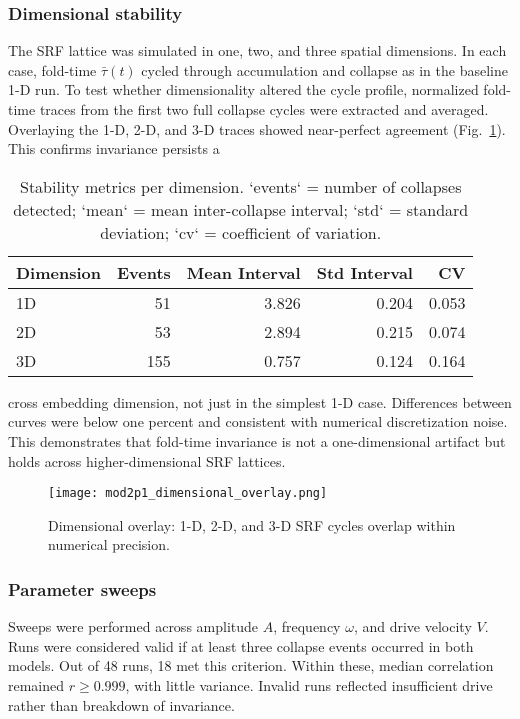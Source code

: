 \documentclass[12pt]{article}
\begin{document}
\subsubsection{Dimensional stability}
The SRF lattice was simulated in one, two, and three spatial dimensions.
In each case, fold-time $\bar{\tau}(t)$ cycled through accumulation and collapse as in the baseline 1-D run.
To test whether dimensionality altered the cycle profile, normalized fold-time traces from the first two full collapse cycles were extracted and averaged.
Overlaying the 1-D, 2-D, and 3-D traces showed near-perfect agreement (Fig.~\ref{fig:dim_overlay}). This confirms invariance persists a\begin{table}[htbp]
\centering
\caption{Stability metrics per dimension.
`events` = number of collapses detected;
`mean` = mean inter-collapse interval;
`std` = standard deviation;
`cv` = coefficient of variation.}
\label{tab:stability_metrics}
\begin{tabular}{lrrrr}
\hline
Dimension & Events & Mean Interval & Std Interval & CV \\
\hline
1D & 51  & 3.826  & 0.204 & 0.053 \\
2D & 53  & 2.894  & 0.215 & 0.074 \\
3D & 155 & 0.757  & 0.124 & 0.164 \\
\hline
\end{tabular}
\end{table}cross embedding dimension, not just in the simplest 1-D case.
Differences between curves were below one percent and consistent with numerical discretization noise.
This demonstrates that fold-time invariance is not a one-dimensional artifact but holds across higher-dimensional SRF lattices.

\begin{figure}[htbp]
  \centering
  \texttt{[image: mod2p1\_dimensional\_overlay.png]}
  \caption{Dimensional overlay: 1-D, 2-D, and 3-D SRF cycles overlap within numerical precision.}
  \label{fig:dim_overlay}
\end{figure}
\FloatBarrier


\subsubsection{Parameter sweeps}
Sweeps were performed across amplitude $A$, frequency $\omega$, and drive velocity $V$.
Runs were considered valid if at least three collapse events occurred in both models.
Out of 48 runs, 18 met this criterion.
Within these, median correlation remained $r \geq 0.999$, with little variance.
Invalid runs reflected insufficient drive rather than breakdown of invariance.
\end{document}
